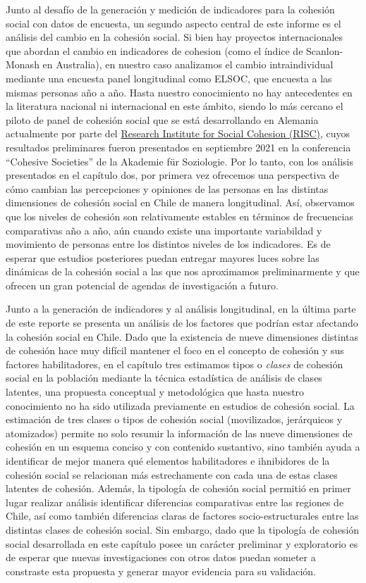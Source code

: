 \documentclass[
  12pt,
]{book}
\begin{document}
Junto al desafío de la generación y medición de indicadores para la cohesión social con datos de encuesta, un segundo aspecto central de este informe es el análisis del cambio en la cohesión social. Si bien hay proyectos internacionales que abordan el cambio en indicadores de cohesion (como el índice de Scanlon-Monash en Australia), en nuestro caso analizamos el cambio intraindividual mediante una encuesta panel longitudinal como ELSOC, que encuesta a las mismas personas año a año. Hasta nuestro conocimiento no hay antecedentes en la literatura nacional ni internacional en este ámbito, siendo lo más cercano el piloto de panel de cohesión social que se está desarrollando en Alemania actualmente por parte del \href{https://www.fgz-risc.de/}{Research Institute for Social Cohesion (RISC)}, cuyos resultados preliminares fueron presentados en septiembre 2021 en la conferencia ``Cohesive Societies'' de la Akademie für Soziologie. Por lo tanto, con los análisis presentados en el capítulo dos, por primera vez ofrecemos una perspectiva de cómo cambian las percepciones y opiniones de las personas en las distintas dimensiones de cohesión social en Chile de manera longitudinal. Así, observamos que los niveles de cohesión son relativamente estables en términos de frecuencias comparativas año a año, aún cuando existe una importante variabildad y movimiento de personas entre los distintos niveles de los indicadores. Es de esperar que estudios posteriores puedan entregar mayores luces sobre las dinámicas de la cohesión social a las que nos aproximamos preliminarmente y que ofrecen un gran potencial de agendas de investigación a futuro.

Junto a la generación de indicadores y al análisis longitudinal, en la última parte de este reporte se presenta un análisis de los factores que podrían estar afectando la cohesión social en Chile. Dado que la existencia de nueve dimensiones distintas de cohesión hace muy difícil mantener el foco en el concepto de cohesión y sus factores habilitadores, en el capítulo tres estimamos tipos o \emph{clases} de cohesión social en la población mediante la técnica estadística de análisis de clases latentes, una propuesta conceptual y metodológica que hasta nuestro conocimiento no ha sido utilizada previamente en estudios de cohesión social. La estimación de tres clases o tipos de cohesión social (movilizados, jerárquicos y atomizados) permite no solo resumir la información de las nueve dimensiones de cohesión en un esquema conciso y con contenido sustantivo, sino también ayuda a identificar de mejor manera qué elementos habilitadores e ihnibidores de la cohesión social se relacionan más estrechamente con cada una de estas clases latentes de cohesión. Además, la tipología de cohesión social permitió en primer lugar realizar análisis identificar diferencias comparativas entre las regiones de Chile, así como también diferencias claras de factores socio-estructurales entre las distintas clases de cohesión social. Sin embargo, dado que la tipología de cohesión social desarrollada en este capítulo posee un carácter preliminar y exploratorio es de esperar que nuevas investigaciones con otros datos puedan someter a constraste esta propuesta y generar mayor evidencia para su validación.
\end{document}

